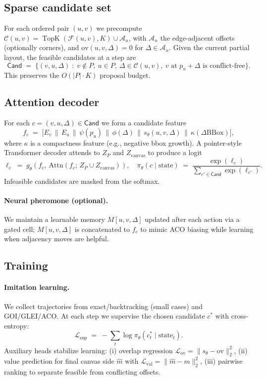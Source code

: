 \documentclass[11pt]{article}
\begin{document}
\subsection{Sparse candidate set}
For each ordered pair $(u,v)$ we precompute
$\mathcal{C}(u,v)=\operatorname{TopK}(\mathcal{F}(u,v),K)\cup\mathcal{A}_n$,
with $\mathcal{A}_n$ the edge-adjacent offsets (optionally corners), and
$\mathrm{ov}(u,v,\Delta)=0$ for $\Delta\in\mathcal{A}_n$.
Given the current partial layout, the feasible candidates at a step are
\[
  \mathsf{Cand} \;=\; \big\{(v,u,\Delta)\;:\; v\notin P,\ u\in P,\ \Delta\in\mathcal{C}(u,v),\ 
  \text{$v$ at $p_u+\Delta$ is conflict-free}\big\}.
\]
This preserves the $O(|P|\cdot K)$ proposal budget.

\subsection{Attention decoder}
For each $c=(v,u,\Delta)\in\mathsf{Cand}$ we form a candidate feature
\[
  f_c \;=\; \big[E_v\,\|\,E_u\,\|\,\psi(p_u)\,\|\,\phi(\Delta)\,\|\,s_\theta(u,v,\Delta)\,\|\,\kappa(\Delta\mathrm{BBox})\big],
\]
where $\kappa$ is a compactness feature (e.g., negative bbox growth).
A pointer-style Transformer decoder attends to $Z_P$ and $Z_{\text{canvas}}$
to produce a logit
\[
  \ell_c \;=\; g_\theta\!\left(f_c,\ \mathrm{Attn}\!\left(f_c;\, Z_P \cup Z_{\text{canvas}}\right)\right),
\quad
  \pi_\theta(c\mid \text{state}) \;=\; \frac{\exp(\ell_c)}{\sum_{c'\in\mathsf{Cand}}\exp(\ell_{c'})}.
\]
Infeasible candidates are masked from the softmax.

\paragraph{Neural pheromone (optional).}
We maintain a learnable memory $M[u,v,\Delta]$ updated after each action via a gated
cell; $M[u,v,\Delta]$ is concatenated to $f_c$ to mimic ACO biasing while learning
when adjacency moves are helpful.

\subsection{Training}
\paragraph{Imitation learning.}
We collect trajectories from exact/backtracking (small cases) and GOI/GLEI/ACO.
At each step we supervise the chosen candidate $c^*$ with cross-entropy:
\[
  \mathcal{L}_{\text{sup}} \;=\; -\sum_t \log \pi_\theta(c_t^* \mid \text{state}_t).
\]
Auxiliary heads stabilize learning:
(i) overlap regression $\mathcal{L}_{\text{ov}} = \|s_\theta - \mathrm{ov}\|_2^2$,
(ii) value prediction for final canvas side $\hat m$ with
$\mathcal{L}_{\text{val}} = \|\hat m - m\|_2^2$,
(iii) pairwise ranking to separate feasible from conflicting offsets.
\end{document}
